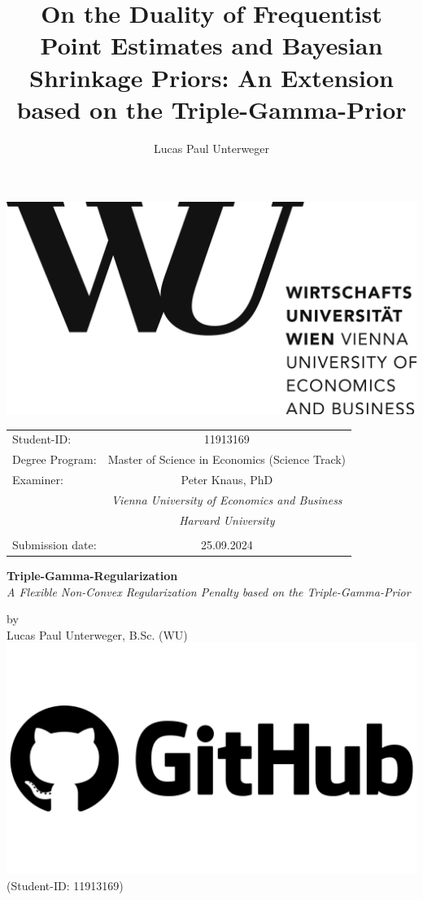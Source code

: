 \documentclass[12pt,a4paper]{article}
\author{Lucas Paul Unterweger}
\title{On the Duality of Frequentist Point Estimates and Bayesian Shrinkage Priors: An Extension based on the Triple-Gamma-Prior}
\begin{document}


\begin{titlepage}
\center
\vfill
\includegraphics[scale=0.1]{WU.png}
\vfill
\begin{tabular}[t]{lc}
Student-ID:  & 11913169 \\
Degree Program: & 
Master of Science in Economics (Science Track) \\
Examiner: & Peter Knaus, PhD \\
			& \textit{Vienna University of Economics and Business} \\
			& \textit{Harvard University} \\
			& \\
Submission date: & 25.09.2024 \\
\end{tabular}
\vfill
{\large \textbf{Triple-Gamma-Regularization} \\
\normalsize \textit{A Flexible Non-Convex Regularization Penalty based on the Triple-Gamma-Prior}}


\vfill
by\\ \vspace{3mm}
{\Large Lucas Paul Unterweger, B.Sc. (WU) \href{https://github.com/therealLucasPaul}{\includegraphics[scale=0.01]{GitHub.png}}}\\
(Student-ID: 11913169)\\
\vfill

\thispagestyle{empty}
\pagebreak
\end{titlepage}
\thispagestyle{empty}
\end{document}
